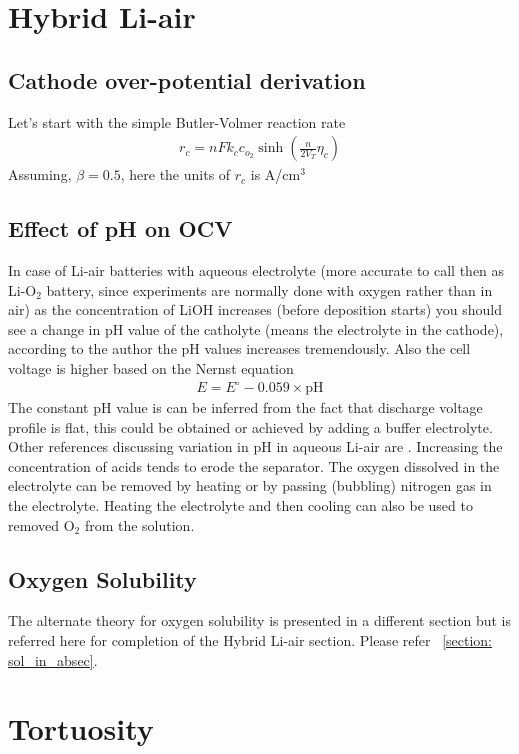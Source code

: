 \documentclass[12pt]{book}
\begin{document}
\chapter{Hybrid Li-air}



\section{Cathode over-potential derivation}
Let's start with the simple Butler-Volmer reaction rate
\begin{align}
r_c= nFk_cc_{o_2}\sinh{\left(\frac{n}{2V_T}\eta_c\right)}
\end{align}
Assuming, $\beta = 0.5$, here the units of $r_c$ is A/cm$^3$

\section{Effect of pH on OCV}
In case of Li-air batteries with aqueous electrolyte (more accurate to call then as Li-O$_2$ battery, since experiments are normally done with oxygen rather than in air) as the concentration of LiOH increases (before deposition starts) you should see a change in pH value of the catholyte (means the electrolyte in the cathode), according to the author the pH values increases tremendously\cite{Li2014e}. Also the cell voltage is higher based on the Nernst equation 
\begin{align}
E=E^\circ-0.059\times \textrm{pH}
\end{align}
The constant pH value is can be inferred from the fact that discharge voltage profile is flat\cite{Li2012}, this could be obtained or achieved by adding a buffer electrolyte. Other references discussing variation in pH in aqueous Li-air are \cite{Lu2014b}. Increasing the concentration of acids tends to erode the separator. The oxygen dissolved in the electrolyte can be removed by heating or by passing (bubbling) nitrogen gas in the electrolyte\cite{Li2013c}. Heating the electrolyte and then cooling can also be used to removed O$_2$ from the solution. 
\section{Oxygen Solubility}
The alternate theory for oxygen solubility is presented in a different section but is referred here for completion of the Hybrid Li-air section.
Please refer ~\ref{section: sol_in_absec}.
\chapter{Tortuosity}
\end{document}
